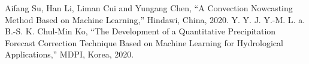 \begin{thebibliography}{99}
 Aifang Su, Han Li, Liman Cui and Yungang Chen, “A Convection Nowcasting Method Based on Machine Learning,” Hindawi, China, 2020.
 Y. Y. J. Y.-M. L. a. B.-S. K. Chul-Min Ko, “The Development of a Quantitative Precipitation Forecast Correction Technique Based on Machine Learning for Hydrological Applications,” MDPI, Korea, 2020.
\end{thebibliography}